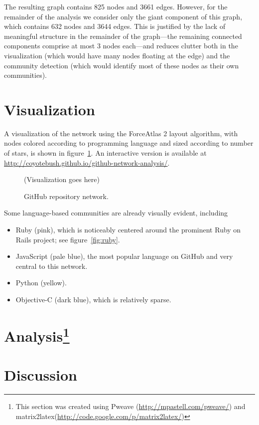 \documentclass[11pt]{article}
\begin{document}
The resulting graph contains 825 nodes and 3661 edges. However, for the
remainder of the analysis we consider only the giant component of this graph,
which contains 632 nodes and 3644 edges. This is justified by the lack of
meaningful structure in the remainder of the graph---the remaining connected
components comprise at most 3 nodes each---and reduces clutter both in the
visualization (which would have many nodes floating at the edge) and the
community detection (which would identify most of these nodes as their own
communities).

\section{Visualization}
A visualization of the network using the ForceAtlas 2 layout algorithm, with
nodes colored according to programming language and sized according to number of
stars, is shown in figure~\ref{fig:fullnetwork}. An interactive version is
available at \url{http://coyotebush.github.io/github-network-analysis/}.

\begin{figure}[htbp]
    \centering
    (Visualization goes here)
    \caption{GitHub repository network.}
    \label{fig:fullnetwork}
\end{figure}

Some language-based communities are already visually evident, including
\begin{itemize}
    \item Ruby (pink), which is noticeably centered around the prominent Ruby on
        Rails project; see figure~\ref{fig:ruby}.
    \item JavaScript (pale blue), the most popular language on GitHub and very
        central to this network.
    \item Python (yellow).
    \item Objective-C (dark blue), which is relatively sparse.
\end{itemize}

\section[Analysis]{Analysis\footnote{This section was created using Pweave
(\url{http://mpastell.com/pweave/}) and
matrix2latex(\url{http://code.google.com/p/matrix2latex/})}}



\section{Discussion}
\end{document}
